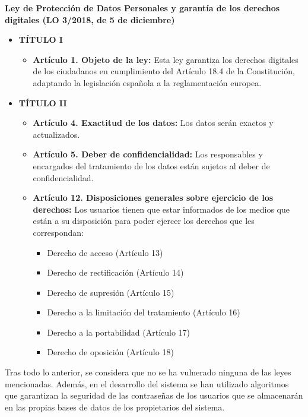 \vspace{.5cm}\noindent\textbf{Ley de Protección de Datos Personales y garantía de los derechos digitales (LO 3/2018, de 5 de diciembre)}~\cite{jefatura_del_estado_ley_2018}
\begin{itemize}
	\item \textbf{TÍTULO I}
	      \begin{itemize}
		      \item \textbf{Artículo 1. Objeto de la ley:} Esta ley garantiza los derechos digitales de los ciudadanos en cumplimiento del Artículo 18.4 de la Constitución, adaptando la legislación española a la reglamentación europea.
	      \end{itemize}
	\item \textbf{TÍTULO II}
	      \begin{itemize}
		      \item \textbf{Artículo 4. Exactitud de los datos:} Los datos serán exactos y actualizados.
		      \item \textbf{Artículo 5. Deber de confidencialidad:} Los responsables y encargados del tratamiento de los datos están sujetos al deber de confidencialidad.
		      \item \textbf{Artículo 12. Disposiciones generales sobre ejercicio de los derechos:} Los usuarios tienen que estar informados de los medios que están a su disposición para poder ejercer los derechos que les correspondan:
		            \begin{itemize}
			            \item Derecho de acceso (Artículo 13)
			            \item Derecho de rectificación (Artículo 14)
			            \item Derecho de supresión (Artículo 15)
			            \item Derecho a la limitación del tratamiento (Artículo 16)
			            \item Derecho a la portabilidad (Artículo 17)
			            \item Derecho de oposición (Artículo 18)
		            \end{itemize}
	      \end{itemize}
\end{itemize}

Tras todo lo anterior, se considera que no se ha vulnerado ninguna de las leyes mencionadas. Además, en el desarrollo del sistema se han utilizado algoritmos que garantizan la seguridad de las contraseñas de los usuarios que se almacenarán en las propias bases de datos de los propietarios del sistema.


